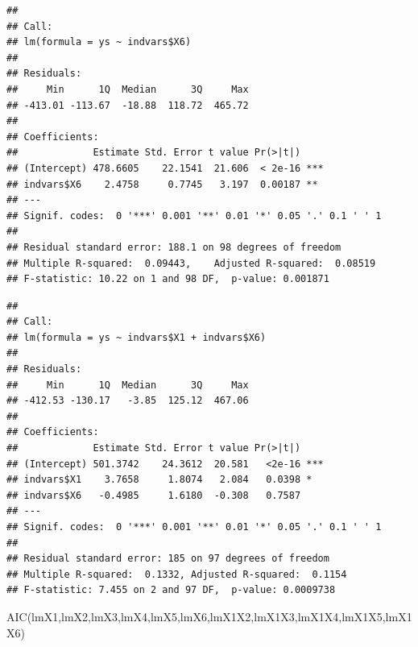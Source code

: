 \documentclass[
]{book}
\newenvironment{Shaded}{\begin{snugshade}}{\end{snugshade}}
\newcommand{\FunctionTok}[1]{\textcolor[rgb]{0.00,0.00,0.00}{#1}}
\newcommand{\NormalTok}[1]{#1}
\newcommand{\OtherTok}[1]{\textcolor[rgb]{0.56,0.35,0.01}{#1}}
\newcommand{\SpecialCharTok}[1]{\textcolor[rgb]{0.00,0.00,0.00}{#1}}
\begin{document}
\begin{Shaded}
\end{Shaded}

\begin{verbatim}
## 
## Call:
## lm(formula = ys ~ indvars$X6)
## 
## Residuals:
##     Min      1Q  Median      3Q     Max 
## -413.01 -113.67  -18.88  118.72  465.72 
## 
## Coefficients:
##             Estimate Std. Error t value Pr(>|t|)    
## (Intercept) 478.6605    22.1541  21.606  < 2e-16 ***
## indvars$X6    2.4758     0.7745   3.197  0.00187 ** 
## ---
## Signif. codes:  0 '***' 0.001 '**' 0.01 '*' 0.05 '.' 0.1 ' ' 1
## 
## Residual standard error: 188.1 on 98 degrees of freedom
## Multiple R-squared:  0.09443,    Adjusted R-squared:  0.08519 
## F-statistic: 10.22 on 1 and 98 DF,  p-value: 0.001871
\end{verbatim}

\begin{Shaded}
\end{Shaded}

\begin{verbatim}
## 
## Call:
## lm(formula = ys ~ indvars$X1 + indvars$X6)
## 
## Residuals:
##     Min      1Q  Median      3Q     Max 
## -412.53 -130.17   -3.85  125.12  467.06 
## 
## Coefficients:
##             Estimate Std. Error t value Pr(>|t|)    
## (Intercept) 501.3742    24.3612  20.581   <2e-16 ***
## indvars$X1    3.7658     1.8074   2.084   0.0398 *  
## indvars$X6   -0.4985     1.6180  -0.308   0.7587    
## ---
## Signif. codes:  0 '***' 0.001 '**' 0.01 '*' 0.05 '.' 0.1 ' ' 1
## 
## Residual standard error: 185 on 97 degrees of freedom
## Multiple R-squared:  0.1332, Adjusted R-squared:  0.1154 
## F-statistic: 7.455 on 2 and 97 DF,  p-value: 0.0009738
\end{verbatim}

\begin{Shaded}
\begin{Highlighting}[]
\FunctionTok{AIC}\NormalTok{(lmX1,lmX2,lmX3,lmX4,lmX5,lmX6,lmX1X2,lmX1X3,lmX1X4,lmX1X5,lmX1X6)}
\end{Highlighting}
\end{Shaded}
\end{document}
